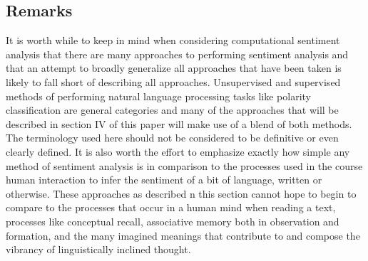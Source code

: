 \documentclass[letterpaper, 10 pt, conference]{ieeeconf}
\begin{document}
\subsection{Remarks}
It is worth while to keep in mind when considering computational sentiment analysis that there are many approaches to performing sentiment analysis and that an attempt to broadly generalize all approaches that have been taken is likely to fall short of describing all approaches. Unsupervised and supervised methods of performing natural language processing tasks like polarity classification are general categories and many of the approaches that will be described in section IV of this paper will make use of a blend of both methods. The terminology used here should not be considered to be definitive or even clearly defined. It is also worth the effort to emphasize exactly how simple any method of sentiment analysis is in comparison to the processes used in the course human interaction to infer the sentiment of a bit of language, written or otherwise. These approaches as described n this section cannot hope to begin to compare to the processes that occur in a human mind when reading a text, processes like conceptual recall, associative memory both in observation and formation, and the many imagined meanings that contribute to and compose the vibrancy of linguistically inclined thought.
\end{document}

